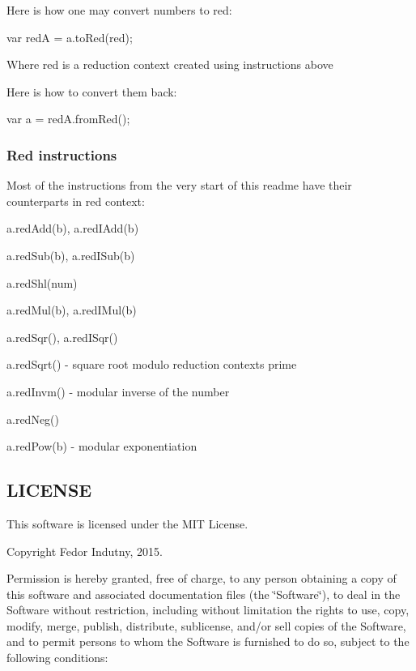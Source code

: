 Here is how one may convert numbers to {\ttfamily red}\+:


\begin{DoxyCode}
var redA = a.toRed(red);
\end{DoxyCode}
 Where {\ttfamily red} is a reduction context created using instructions above

Here is how to convert them back\+:


\begin{DoxyCode}
var a = redA.fromRed();
\end{DoxyCode}


\subsubsection*{Red instructions}

Most of the instructions from the very start of this readme have their counterparts in red context\+:


\begin{DoxyItemize}
\item {\ttfamily a.\+red\+Add(b)}, {\ttfamily a.\+red\+I\+Add(b)}
\item {\ttfamily a.\+red\+Sub(b)}, {\ttfamily a.\+red\+I\+Sub(b)}
\item {\ttfamily a.\+red\+Shl(num)}
\item {\ttfamily a.\+red\+Mul(b)}, {\ttfamily a.\+red\+I\+Mul(b)}
\item {\ttfamily a.\+red\+Sqr()}, {\ttfamily a.\+red\+I\+Sqr()}
\item {\ttfamily a.\+red\+Sqrt()} -\/ square root modulo reduction context\textquotesingle{}s prime
\item {\ttfamily a.\+red\+Invm()} -\/ modular inverse of the number
\item {\ttfamily a.\+red\+Neg()}
\item {\ttfamily a.\+red\+Pow(b)} -\/ modular exponentiation
\end{DoxyItemize}

\subsection*{L\+I\+C\+E\+N\+SE}

This software is licensed under the M\+IT License.

Copyright Fedor Indutny, 2015.

Permission is hereby granted, free of charge, to any person obtaining a copy of this software and associated documentation files (the \char`\"{}\+Software\char`\"{}), to deal in the Software without restriction, including without limitation the rights to use, copy, modify, merge, publish, distribute, sublicense, and/or sell copies of the Software, and to permit persons to whom the Software is furnished to do so, subject to the following conditions\+:

